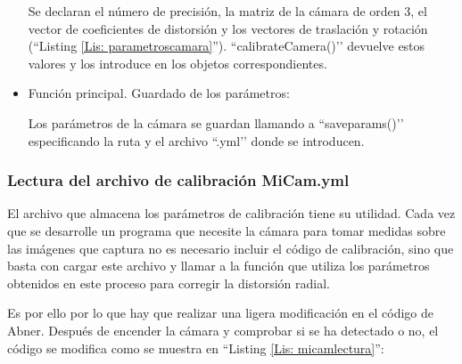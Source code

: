 \begin{itemize}
Se declaran el número de precisión, la matriz de la cámara de orden 3, el vector de coeficientes de distorsión y los vectores de traslación y rotación (``Listing \ref{Lis: parametroscamara}''). ``calibrateCamera()’’ devuelve estos valores y los introduce en los objetos correspondientes. 
\clearpage
    \item Función principal. Guardado de los parámetros:
    
    
Los parámetros de la cámara se guardan llamando a ``saveparams()’’ especificando la ruta y el archivo ``.yml’’  donde se introducen.

\end{itemize}


\subsubsection{Lectura del archivo de calibración MiCam.yml}\label{s3_2_2_3}

El archivo que almacena los parámetros de calibración tiene su utilidad. Cada vez que se desarrolle un programa que necesite la cámara para tomar medidas sobre las imágenes que captura no es necesario incluir el código de calibración, sino que basta con cargar este archivo y llamar a la función que utiliza los parámetros obtenidos en este proceso para corregir la distorsión radial.

Es por ello por lo que hay que realizar una ligera modificación en el código de Abner. Después de encender la cámara y comprobar si se ha detectado o no, el código se modifica como se muestra en ``Listing \ref{Lis: micamlectura}'': 

